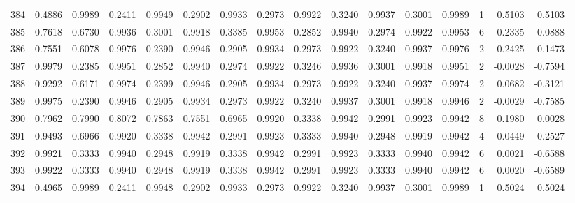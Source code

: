 \begin{tabular}{lrrrrrrrrrrrrrrr}
384 &      0.4886 &  0.9989 &  0.2411 &  0.9949 &  0.2902 &  0.9933 &  0.2973 &  0.9922 &  0.3240 &  0.9937 &   0.3001 &     0.9989 &      1 &                    0.5103 &                     0.5103 \\
385 &      0.7618 &  0.6730 &  0.9936 &  0.3001 &  0.9918 &  0.3385 &  0.9953 &  0.2852 &  0.9940 &  0.2974 &   0.9922 &     0.9953 &      6 &                    0.2335 &                    -0.0888 \\
386 &      0.7551 &  0.6078 &  0.9976 &  0.2390 &  0.9946 &  0.2905 &  0.9934 &  0.2973 &  0.9922 &  0.3240 &   0.9937 &     0.9976 &      2 &                    0.2425 &                    -0.1473 \\
387 &      0.9979 &  0.2385 &  0.9951 &  0.2852 &  0.9940 &  0.2974 &  0.9922 &  0.3246 &  0.9936 &  0.3001 &   0.9918 &     0.9951 &      2 &                   -0.0028 &                    -0.7594 \\
388 &      0.9292 &  0.6171 &  0.9974 &  0.2399 &  0.9946 &  0.2905 &  0.9934 &  0.2973 &  0.9922 &  0.3240 &   0.9937 &     0.9974 &      2 &                    0.0682 &                    -0.3121 \\
389 &      0.9975 &  0.2390 &  0.9946 &  0.2905 &  0.9934 &  0.2973 &  0.9922 &  0.3240 &  0.9937 &  0.3001 &   0.9918 &     0.9946 &      2 &                   -0.0029 &                    -0.7585 \\
390 &      0.7962 &  0.7990 &  0.8072 &  0.7863 &  0.7551 &  0.6965 &  0.9920 &  0.3338 &  0.9942 &  0.2991 &   0.9923 &     0.9942 &      8 &                    0.1980 &                     0.0028 \\
391 &      0.9493 &  0.6966 &  0.9920 &  0.3338 &  0.9942 &  0.2991 &  0.9923 &  0.3333 &  0.9940 &  0.2948 &   0.9919 &     0.9942 &      4 &                    0.0449 &                    -0.2527 \\
392 &      0.9921 &  0.3333 &  0.9940 &  0.2948 &  0.9919 &  0.3338 &  0.9942 &  0.2991 &  0.9923 &  0.3333 &   0.9940 &     0.9942 &      6 &                    0.0021 &                    -0.6588 \\
393 &      0.9922 &  0.3333 &  0.9940 &  0.2948 &  0.9919 &  0.3338 &  0.9942 &  0.2991 &  0.9923 &  0.3333 &   0.9940 &     0.9942 &      6 &                    0.0020 &                    -0.6589 \\
394 &      0.4965 &  0.9989 &  0.2411 &  0.9948 &  0.2902 &  0.9933 &  0.2973 &  0.9922 &  0.3240 &  0.9937 &   0.3001 &     0.9989 &      1 &                    0.5024 &                     0.5024 \\

\end{tabular}
